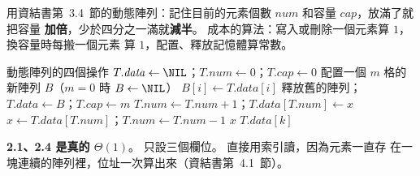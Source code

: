 \begin{pastsoln}
用資結書第~3.4~節的動態陣列：記住目前的元素個數 $\mathit{num}$ 和容量 $\mathit{cap}$，放滿了就把容量
\textbf{加倍}，少於四分之一滿就\textbf{減半}。 成本的算法：寫入或刪除一個元素算 $1$，換容量時每搬一個元素
算 $1$，配置、釋放記憶體算常數。

\begin{pseudo}{動態陣列的四個操作}
 
    \State $T.\mathit{data} \gets \NIL$；$T.\mathit{num} \gets 0$；$T.\mathit{cap} \gets 0$
\EndProcedure
\Statex
{} 
    \State 配置一個 $m$ 格的新陣列 $B$（$m = 0$ 時 $B \gets \NIL$）
        \State $B[i] \gets T.\mathit{data}[i]$
    \EndFor
    \State 釋放舊的陣列；$T.\mathit{data} \gets B$；$T.\mathit{cap} \gets m$
\EndProcedure
\Statex
{} 
        \State {}
    \EndIf
    \State $T.\mathit{num} \gets T.\mathit{num} + 1$；$T.\mathit{data}[T.\mathit{num}] \gets x$
\EndProcedure
\Statex
{} 
    \State $x \gets T.\mathit{data}[T.\mathit{num}]$；$T.\mathit{num} \gets T.\mathit{num} - 1$
        \State {}
        \State {}
    \EndIf
    \State \Return $x$
\EndFunction
\Statex
{} 
    \State \Return $T.\mathit{data}[k]$
\EndFunction
\end{pseudo}

\textbf{2.1、2.4 是真的 $\Theta(1)$}。  只設三個欄位。  直接用索引讀，因為元素一直存
在一塊連續的陣列裡，位址一次算出來（資結書第~4.1~節）。


\end{pastsoln}
